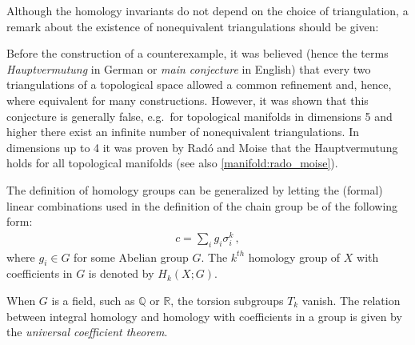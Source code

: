     Although the homology invariants do not depend on the choice of triangulation, a remark about the existence of nonequivalent triangulations should be given:
    \begin{remark}[Hauptvermutung]
        Before the construction of a counterexample, it was believed (hence the terms \textit{Hauptvermutung} in German or \textit{main conjecture} in English) that every two triangulations of a topological space allowed a common refinement and, hence, where equivalent for many constructions. However, it was shown that this conjecture is generally false, e.g.~for topological manifolds in dimensions 5 and higher there exist an infinite number of nonequivalent triangulations. In dimensions up to 4 it was proven by Rad\'o and Moise that the Hauptvermutung holds for all topological manifolds (see also \cref{manifold:rado_moise}).
    \end{remark}

    \begin{construct}
        The definition of homology groups can be generalized by letting the (formal) linear combinations used in the definition of the chain group be of the following form:
        \begin{gather}
            c = \sum_ig_i\sigma_i^k\,,
        \end{gather}
        where $g_i\in G$ for some Abelian group $G$. The $k^{th}$ homology group of $X$ with coefficients in $G$ is denoted by $H_k(X;G)$.
    \end{construct}
    \begin{property}
        When $G$ is a field, such as $\mathbb{Q}$ or $\mathbb{R}$, the torsion subgroups $T_k$ vanish. The relation between integral homology and homology with coefficients in a group is given by the \textit{universal coefficient theorem}.
    \end{property}


